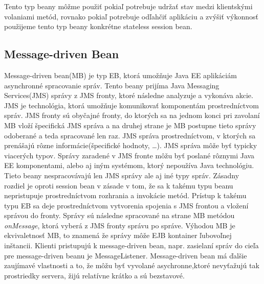 Tento typ beany môžme použiť pokiaľ potrebuje udržať stav medzi klientskými volaniami metód, rovnako pokiaľ potrebuje odľahčiť aplikáciu a zvýšiť výkonnosť použijeme tento typ beany konkrétne stateless session bean. 

\subsection{Message-driven Bean}\label{messagekap}
Message-driven bean(MB) je typ EB, ktorá umožňuje Java EE aplikáciám asynchronné spracovanie správ. Tento beany prijíma Java Messaging Services(JMS) správy z JMS fronty, ktoré následne analyzuje a vykonáva akcie. JMS je technológia, ktorá umožňuje komunikovať komponentám prostredníctvom správ. JMS fronty sú obyčajné fronty, do ktorých sa na jednom konci pri zavolaní MB vloží špecifická JMS správa a na druhej strane je MB postupne tieto správy odoberané a teda spracované len raz. JMS správa prostredníctvom, v ktorých sa prenášajú rôzne informácie(špecifické hodnoty, \ldots). JMS správa môže byť typicky viacerých typov. Správy zaradené v JMS fronte môžu byť poslané rôznymi Java EE komponentami, alebo aj iným systémom, ktorý nepoužíva Java technológiu. Tieto beany nespracovávajú len JMS správy ale aj iné typy správ. Zásadny rozdiel je oproti  session bean v zásade v tom, že sa k takému  typu beanu nepristupuje prostredníctvom rozhrania a invokácie metód. Prístup k takému typu EB sa deje prostredníctvom vytvorenia spojenia s JMS frontou a vložení správou do fronty. Správy sú následne spracované na strane MB metódou \emph{onMessage}, ktorá vyberá z JMS fronty správu po správe. Výhodou MB je ekvivaletnosť MB, to znamená že správy môže EJB kontainer ľubovoľnej inštancii. Klienti pristupujú k message-driven bean, napr. zasielaní správ do cieľa pre message-driven beanu je MessageListener. Message-driven bean má ďalšie zaujímavé vlastnosti a to, že môžu byť vyvolané asychronne,ktoré nevyťažujú tak prostriedky servera, žijú relatívne krátko a sú bezstavové. 



